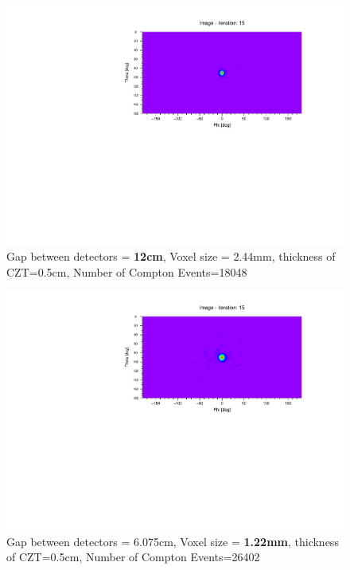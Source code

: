 \documentclass[10pt,a4paper]{article}
\begin{document}
\begin{figure}[H]
\centering
\includegraphics[trim={0 5cm 0 5cm}, scale=.75, angle=270, origin=c]{czt_g12}
\caption{Gap between detectors = \textbf{12cm}, Voxel size = 2.44mm, thickness of CZT=0.5cm, Number of Compton Events=18048}
\end{figure}

\begin{figure}[H]
\centering
\includegraphics[trim={0 5cm 0 5cm}, scale=.75, angle=270, origin=c]{czt_v0122}
\caption{Gap between detectors = 6.075cm, Voxel size = \textbf{1.22mm}, thickness of CZT=0.5cm, Number of Compton Events=26402}
\end{figure}
\end{document}
